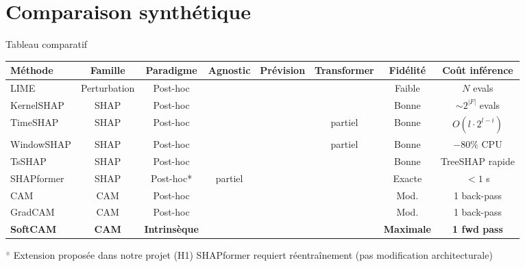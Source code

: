 \documentclass[10pt]{beamer}
\begin{document}
\section{Comparaison synthétique}

\begin{frame}{Tableau comparatif}
	\begin{tcolorbox}[colback=blue!3, colframe=blue!40!black, arc=2mm, boxrule=0.5pt]
		\tiny
		\begin{tabular}{lccccccc}
			\toprule
			\textbf{Méthode} & \textbf{Famille} & \textbf{Paradigme} & \textbf{Agnostic} & \textbf{Prévision} & \textbf{Transformer} & \textbf{Fidélité} & \textbf{Coût inférence} \\
			\midrule
			LIME        & Perturbation & Post-hoc & \checkmark & \texttimes & \checkmark & Faible  & $N$ evals \\
			KernelSHAP  & SHAP & Post-hoc & \checkmark & \texttimes & \checkmark & Bonne   & $\sim 2^{|F|}$ evals \\
			TimeSHAP    & SHAP & Post-hoc & \checkmark & \texttimes & partiel    & Bonne   & $O(l \cdot 2^{l-i})$ \\
			WindowSHAP  & SHAP & Post-hoc & \checkmark & \texttimes & partiel    & Bonne   & $-80\%$ CPU \\
			TsSHAP      & SHAP & Post-hoc & \checkmark & \checkmark & \checkmark & Bonne   & TreeSHAP rapide \\
			SHAPformer  & SHAP & Post-hoc* & partiel   & \checkmark & \checkmark & Exacte  & $<1$ s \\
			\midrule
			CAM         & CAM & Post-hoc & \texttimes & \texttimes & \texttimes & Mod.    & 1 back-pass \\
			GradCAM     & CAM & Post-hoc & \texttimes & \texttimes & \texttimes & Mod.    & 1 back-pass \\
			\textbf{SoftCAM} & \textbf{CAM} & \textbf{Intrinsèque} & \texttimes & \textbf{\checkmark*} & \textbf{\checkmark*} & \textbf{Maximale} & \textbf{1 fwd pass} \\
			\bottomrule
		\end{tabular}
	\end{tcolorbox}
	
	\vspace{2pt}
	\tiny
	\textcolor{gray}{*} Extension proposée dans notre projet (H1) \hfill * SHAPformer requiert réentraînement (pas modification architecturale)
\end{frame}
\end{document}

